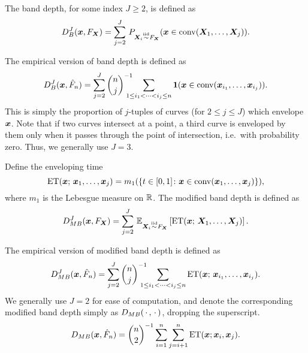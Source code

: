 \begin{definition}
    The band depth, for some index $J \geq 2$, is defined as
    \begin{equation}
        D_B^J(\bm{x}, F_{\bm{X}}) = \sum_{j = 2}^J\, P_{\bm{X}_i \overset{\text{iid}}{\sim} F_{\bm{X}}}(\bm{x} \in \operatorname{conv}(\bm{X}_1, \dots, \bm{X}_j)).
    \end{equation}
\end{definition}
The empirical version of band depth is defined as
\begin{equation}
    D_B^J(\bm{x}, \hat{F}_n) = \sum_{j = 2}^J\binom{n}{j}^{-1} \hspace{-1em}\sum_{\substack{1 \leq i_1 < \dots < i_j \leq n}} \bm{1}(\bm{x} \in \operatorname{conv}(\bm{x}_{i_1}, \dots, \bm{x}_{i_j})).
\end{equation}
This is simply the proportion of $j$-tuples of curves (for $2 \leq j \leq J$)
which envelope $\bm{x}$.
Note that if two curves intersect at a point, a third curve is enveloped by
them only when it passes through the point of intersection, i.e.\ with
probability zero.
Thus, we generally use $J = 3$.


\begin{definition}
    Define the enveloping time
    \begin{equation}
        \operatorname{ET}(\bm{x};\, \bm{x}_1, \dots, \bm{x}_j) = m_1(\{t \in [0, 1]\colon \bm{x} \in \operatorname{conv}(\bm{x}_1, \dots, \bm{x}_j)\}),
    \end{equation}
    where $m_1$ is the Lebesgue measure on $\mathbb{R}$.
    The modified band depth is defined as
    \begin{equation}
        D_{MB}^J(\bm{x}, F_{\bm{X}}) = \sum_{j = 2}^J\, \operatorname{\mathbb{E}}_{\bm{X}_i \overset{\text{iid}}{\sim} F_{\bm{X}}}\left[ \operatorname{ET}(\bm{x};\, \bm{X}_1, \dots, \bm{X}_j)\right].
    \end{equation}
\end{definition}
The empirical version of modified band depth is defined as
\begin{equation}
    D_{MB}^J(\bm{x}, \hat{F}_n) = \sum_{j = 2}^J\binom{n}{j}^{-1} \hspace{-1em} \sum_{\substack{1 \leq i_1 < \dots < i_j \leq n}} \operatorname{ET}(\bm{x};\, \bm{x}_{i_1}, \dots, \bm{x}_{i_j}).
\end{equation}
We generally use $J = 2$ for ease of computation, and denote the corresponding
modified band depth simply as $D_{MB}(\,\cdot\,, \,\cdot\,)$, dropping the
superscript.
\begin{equation}
    D_{MB}(\bm{x}, \hat{F}_n) = \binom{n}{2}^{-1}\sum_{i = 1}^n\sum_{j = i + 1}^n \operatorname{ET}(\bm{x}; \bm{x}_i, \bm{x}_j).
\end{equation}



